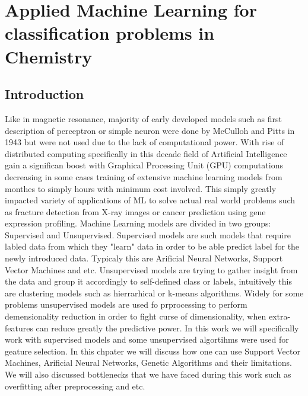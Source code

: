 \chapter{Applied Machine Learning for classification problems in Chemistry}
\section{Introduction}
Like in magnetic resonance, majority of early developed models such as first description of perceptron or simple neuron were done by McCulloh and Pitts in 1943\cite{McCulloch1943} but were not used due to the lack of computational power. With rise of distributed computing specifically in this decade field of Artificial Intelligence gain a significan boost with Graphical Processing Unit (GPU) computations decreasing in some cases training of extensive machine learning models from monthes to simply hours with minimum cost involved. This simply greatly impacted variety of applications of ML to solve actual real world problems such as fracture detection from X-ray images\cite{Tian2003} or cancer prediction using gene expression profiling\cite{khan:2001}. Machine Learning models are divided in two groups: Supervised and Unsupervised. Supervised models are such models that require labled data from which they "learn" data in order to be able predict label for the newly introduced data. Typicaly this are Arificial Neural Networks, Support Vector Machines and etc. Unsupervised models are trying to gather insight from the data and group it accordingly to self-defined class or labels, intuitively this are clustering models such as hierrarhical or k-means algorithms. Widely for some problems unsupervised models are used fo prprocessing to perform demensionality reduction in order to fight curse of dimensionality, when extra-features can reduce greatly the predictive power. In this work we will specifically work with supervised models and some unsupervised algortihms were used for geature selection. In this chpater we will discuss how one can use Support Vector Machines, Arificial Neural Networks, Genetic Algorithms and their limitations. We will also discussed bottlenecks that we have faced during this work such as overfitting after preprocessing and etc. 
